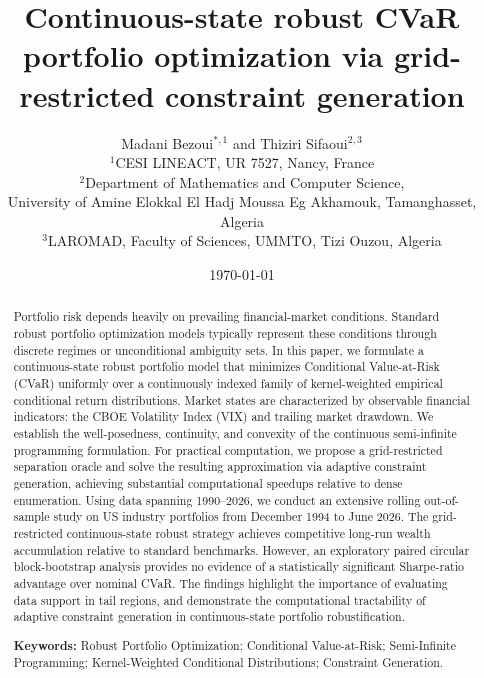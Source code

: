\documentclass[11pt, a4paper]{article}
\title{Continuous-state robust CVaR portfolio optimization via grid-restricted constraint generation}
\author{
Madani Bezoui$^{*,1}$ and Thiziri Sifaoui$^{2,3}$ \\
\small $^1$CESI LINEACT, UR 7527, Nancy, France \\
\small $^2$Department of Mathematics and Computer Science, \\ \small University of Amine Elokkal El Hadj Moussa Eg Akhamouk, Tamanghasset, Algeria \\
\small $^3$LAROMAD, Faculty of Sciences, UMMTO, Tizi Ouzou, Algeria
}
\date{\today}
\begin{document}
\maketitle
\begin{NoHyper}\def\thefootnote{*}\end{NoHyper}

\begin{abstract}
Portfolio risk depends heavily on prevailing financial-market conditions. Standard robust portfolio optimization models typically represent these conditions through discrete regimes or unconditional ambiguity sets. In this paper, we formulate a continuous-state robust portfolio model that minimizes Conditional Value-at-Risk (CVaR) uniformly over a continuously indexed family of kernel-weighted empirical conditional return distributions. Market states are characterized by observable financial indicators: the CBOE Volatility Index (VIX) and trailing market drawdown. We establish the well-posedness, continuity, and convexity of the continuous semi-infinite programming formulation. For practical computation, we propose a grid-restricted separation oracle and solve the resulting approximation via adaptive constraint generation, achieving substantial computational speedups relative to dense enumeration. Using data spanning 1990--2026, we conduct an extensive rolling out-of-sample study on US industry portfolios from December 1994 to June 2026. The grid-restricted continuous-state robust strategy achieves competitive long-run wealth accumulation relative to standard benchmarks. However, an exploratory paired circular block-bootstrap analysis provides no evidence of a statistically significant Sharpe-ratio advantage over nominal CVaR. The findings highlight the importance of evaluating data support in tail regions, and demonstrate the computational tractability of adaptive constraint generation in continuous-state portfolio robustification.

\textbf{Keywords:} Robust Portfolio Optimization; Conditional Value-at-Risk; Semi-Infinite Programming; Kernel-Weighted Conditional Distributions; Constraint Generation.
\end{abstract}

\newpage
\end{document}
